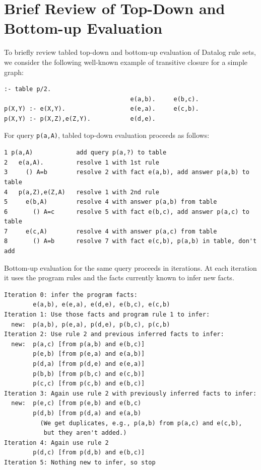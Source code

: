 \section{Brief Review of Top-Down and Bottom-up Evaluation}
\label{tdbu-eval}

To briefly review tabled top-down and bottom-up evaluation of Datalog
rule sets, we consider the following well-known example of transitive
closure for a simple graph:

\footnotesize
\begin{verbatim}
:- table p/2.
                                   e(a,b).     e(b,c).
p(X,Y) :- e(X,Y).                  e(e,a).     e(c,b).
p(X,Y) :- p(X,Z),e(Z,Y).           e(d,e).
\end{verbatim}
\normalsize

\begin{example}
For query {\tt p(a,A)}, tabled top-down evaluation proceeds as
follows:
\footnotesize
\begin{verbatim}
1 p(a,A)            add query p(a,?) to table
2   e(a,A).         resolve 1 with 1st rule
3     () A=b        resolve 2 with fact e(a,b), add answer p(a,b) to table
4   p(a,Z),e(Z,A)   resolve 1 with 2nd rule
5     e(b,A)        resolve 4 with answer p(a,b) from table
6       () A=c      resolve 5 with fact e(b,c), add answer p(a,c) to table
7     e(c,A)        resolve 4 with answer p(a,c) from table
8       () A=b      resolve 7 with fact e(c,b), p(a,b) in table, don't add
\end{verbatim}
\normalsize
\end{example}
  
\begin{example} \label{bu-p2}
Bottom-up evaluation for the same query proceeds in iterations. At
each iteration it uses the program rules and the facts currently known
to infer new facts.

\footnotesize
\begin{verbatim}
Iteration 0: infer the program facts:
        e(a,b), e(e,a), e(d,e), e(b,c), e(c,b)
Iteration 1: Use those facts and program rule 1 to infer:
  new:  p(a,b), p(e,a), p(d,e), p(b,c), p(c,b)
Iteration 2: Use rule 2 and previous inferred facts to infer:
  new:  p(a,c) [from p(a,b) and e(b,c)]
        p(e,b) [from p(e,a) and e(a,b)]
        p(d,a) [from p(d,e) and e(e,a)]
        p(b,b) [from p(b,c) and e(c,b)]
        p(c,c) [from p(c,b) and e(b,c)]
Iteration 3: Again use rule 2 with previously inferred facts to infer:
  new:  p(e,c) [from p(e,b) and e(b,c)
        p(d,b) [from p(d,a) and e(a,b)
          (We get duplicates, e.g., p(a,b) from p(a,c) and e(c,b),
           but they aren't added.)
Iteration 4: Again use rule 2
        p(d,c) [from p(d,b) and e(b,c)]
Iteration 5: Nothing new to infer, so stop
\end{verbatim}
\normalsize
\end{example}

